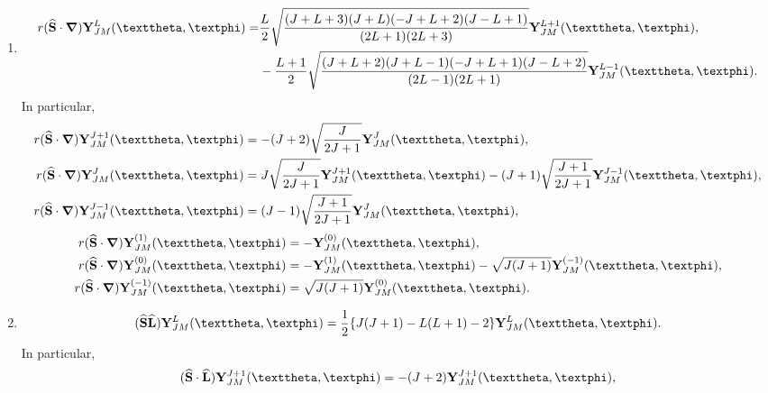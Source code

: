 \begin{enumerate}[label=(\alph*)]
\begin{align}
\end{align}
\item
\begin{align}
 r(\widehat{\vect{S}}\cdot \boldsymbol{\nabla}) \vect{Y}_{J M}^{L}(\vartheta, \varphi)=&\frac{L}{2} \sqrt{\frac{(J+L+3)(J+L)(-J+L+2)(J-L+1)}{(2 L+1)(2 L+3)}} \vect{Y}_{J M}^{L+1}(\vartheta, \varphi), \notag\\
&-\frac{L+1}{2} \sqrt{\frac{(J+L+2)(J+L-1)(-J+L+1)(J-L+2)}{(2 L-1)(2 L+1)}} \vect{Y}_{J M}^{L-1}(\vartheta, \varphi). \label{eq:7:3:64}
\end{align}
In particular,
\begin{align}
r(\widehat{\vect{S}}\cdot \boldsymbol{\nabla}) \vect{Y}_{J M}^{J+1}(\vartheta, \varphi) & =-(J+2) \sqrt{\frac{J}{2 J+1}} \vect{Y}_{J M}^{J}(\vartheta, \varphi), \notag\\
r(\widehat{\vect{S}}\cdot \boldsymbol{\nabla}) \vect{Y}_{J M}^{J}(\vartheta, \varphi) & =J \sqrt{\frac{J}{2 J+1}} \vect{Y}_{J M}^{J+1}(\vartheta, \varphi)-(J+1) \sqrt{\frac{J+1}{2 J+1}} \vect{Y}_{J M}^{J-1}(\vartheta, \varphi), \label{eq:7:3:65}\\
r(\widehat{\vect{S}}\cdot \boldsymbol{\nabla}) \vect{Y}_{J M}^{J-1}(\vartheta, \varphi) & =(J-1) \sqrt{\frac{J+1}{2 J+1}} \vect{Y}_{J M}^{J}(\vartheta, \varphi), \notag
\end{align}
\begin{align}
r(\widehat{\vect{S}}\cdot \boldsymbol{\nabla}) \vect{Y}_{J M}^{(1)}(\vartheta, \varphi) & =-\vect{Y}_{J M}^{(0)}(\vartheta, \varphi), \notag\\
r(\widehat{\vect{S}}\cdot \boldsymbol{\nabla}) \vect{Y}_{J M}^{(0)}(\vartheta, \varphi) & =-\vect{Y}_{J M}^{(1)}(\vartheta, \varphi)-\sqrt{J(J+1)} \vect{Y}_{J M}^{(-1)}(\vartheta, \varphi), \label{eq:7:3:66}\\
r(\widehat{\vect{S}}\cdot \boldsymbol{\nabla}) \vect{Y}_{J M}^{(-1)}(\vartheta, \varphi) & =\sqrt{J(J+1)} \vect{Y}_{J M}^{(0)}(\vartheta, \varphi). \notag
\end{align}
\item
\begin{equation}
(\widehat{\vect{S}} \widehat{\vect{L}}) \vect{Y}_{J M}^{L}(\vartheta, \varphi)=\frac{1}{2}\{J(J+1)-L(L+1)-2\} \vect{Y}_{J M}^{L}(\vartheta, \varphi). \label{eq:7:3:67}
\end{equation}
In particular,
\begin{align}
(\widehat{\vect{S}} \cdot \widehat{\vect{L}}) \vect{Y}_{J M}^{J+1}(\vartheta, \varphi) & =-(J+2) \vect{Y}_{J M}^{J+1}(\vartheta, \varphi), \notag\\

\end{align}
\end{enumerate}
